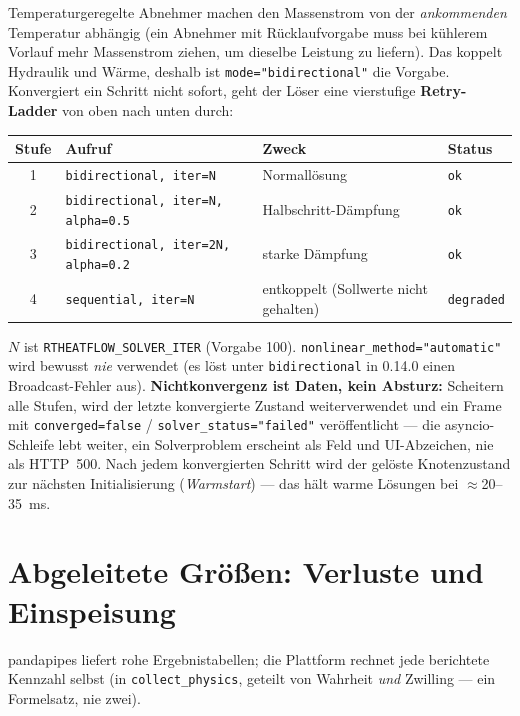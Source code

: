 \documentclass[11pt,a4paper,parskip=half]{scrreprt}
\newcommand{\api}[1]{\texttt{#1}}
\begin{document}
Temperaturgeregelte Abnehmer machen den Massenstrom von der \emph{ankommenden}
Temperatur abhängig (ein Abnehmer mit Rücklaufvorgabe muss bei kühlerem Vorlauf
mehr Massenstrom ziehen, um dieselbe Leistung zu liefern). Das koppelt
Hydraulik und Wärme, deshalb ist \texttt{mode="bidirectional"} die Vorgabe.
Konvergiert ein Schritt nicht sofort, geht der Löser eine vierstufige
\textbf{Retry-Ladder} von oben nach unten durch:

{\small
\begin{center}
\begin{tabular}{@{}clll@{}}
\toprule
Stufe & Aufruf & Zweck & Status \\
\midrule
1 & \texttt{bidirectional, iter=N}            & Normallösung        & \texttt{ok} \\
2 & \texttt{bidirectional, iter=N, alpha=0.5} & Halbschritt-Dämpfung & \texttt{ok} \\
3 & \texttt{bidirectional, iter=2N, alpha=0.2}& starke Dämpfung      & \texttt{ok} \\
4 & \texttt{sequential, iter=N}               & entkoppelt (Sollwerte nicht gehalten) & \texttt{degraded} \\
\bottomrule
\end{tabular}
\end{center}}

$N$ ist \api{RTHEATFLOW\_SOLVER\_ITER} (Vorgabe 100). \texttt{nonlinear\_method="automatic"}
wird bewusst \emph{nie} verwendet (es löst unter \texttt{bidirectional} in
0.14.0 einen Broadcast-Fehler aus). \textbf{Nichtkonvergenz ist Daten, kein
Absturz:} Scheitern alle Stufen, wird der letzte konvergierte Zustand
weiterverwendet und ein Frame mit \texttt{converged=false} /
\texttt{solver\_status="failed"} veröffentlicht --- die asyncio-Schleife lebt
weiter, ein Solverproblem erscheint als Feld und UI-Abzeichen, nie als
HTTP~500. Nach jedem konvergierten Schritt wird der gelöste Knotenzustand zur
nächsten Initialisierung (\emph{Warmstart}) --- das hält warme Lösungen bei
$\approx$20--35~ms.

\section{Abgeleitete Größen: Verluste und Einspeisung}

pandapipes liefert rohe Ergebnistabellen; die Plattform rechnet jede berichtete
Kennzahl selbst (in \texttt{collect\_physics}, geteilt von Wahrheit \emph{und}
Zwilling --- ein Formelsatz, nie zwei).
\end{document}
